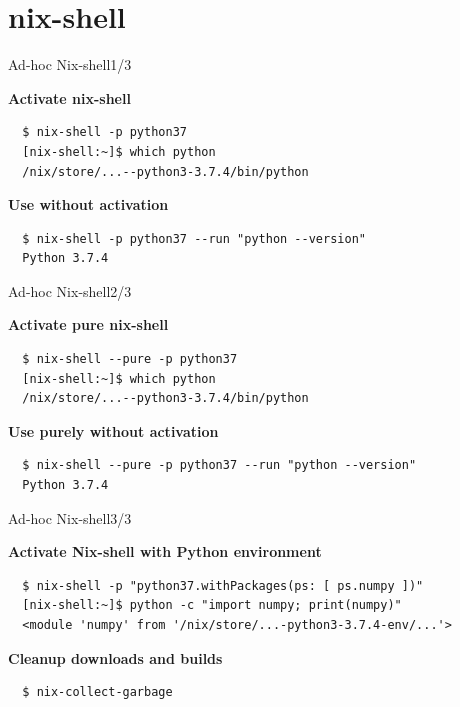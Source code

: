 \documentclass[12pt,aspectratio=169]{beamer}
\begin{document}
\section{nix-shell}


\begin{frame}[fragile]{Ad-hoc Nix-shell\hfill1/3}

  \textbf{Activate nix-shell}
  \begin{verbatim}
  $ nix-shell -p python37
  [nix-shell:~]$ which python
  /nix/store/...--python3-3.7.4/bin/python
  \end{verbatim}

  \textbf{Use without activation}
  \begin{verbatim}
  $ nix-shell -p python37 --run "python --version"
  Python 3.7.4
  \end{verbatim}

\end{frame}


\begin{frame}[fragile]{Ad-hoc Nix-shell\hfill2/3}

  \textbf{Activate pure nix-shell}
  \begin{verbatim}
  $ nix-shell --pure -p python37
  [nix-shell:~]$ which python
  /nix/store/...--python3-3.7.4/bin/python
  \end{verbatim}

  \textbf{Use purely without activation}
  \begin{verbatim}
  $ nix-shell --pure -p python37 --run "python --version"
  Python 3.7.4
  \end{verbatim}

\end{frame}


\begin{frame}[fragile]{Ad-hoc Nix-shell\hfill3/3}

  \textbf{Activate Nix-shell with Python environment}
  \begin{verbatim}
  $ nix-shell -p "python37.withPackages(ps: [ ps.numpy ])"
  [nix-shell:~]$ python -c "import numpy; print(numpy)"
  <module 'numpy' from '/nix/store/...-python3-3.7.4-env/...'>
  \end{verbatim}

  \textbf{Cleanup downloads and builds}
  \begin{verbatim}
  $ nix-collect-garbage
  \end{verbatim}

\end{frame}
\end{document}
